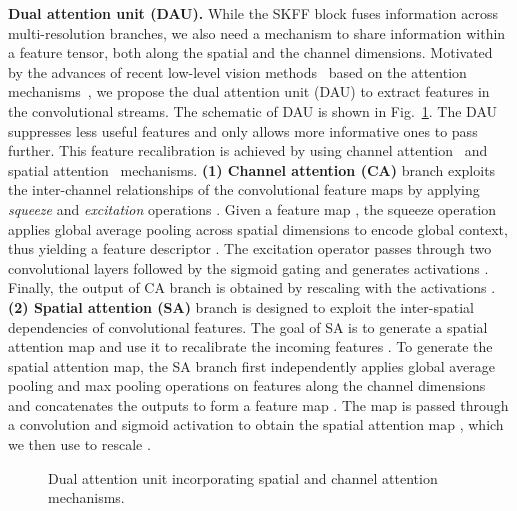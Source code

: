\documentclass[runningheads]{llncs}
\begin{document}
\vspace{0.4em} \noindent \textbf{Dual attention unit (DAU).}
While the SKFF block fuses information across multi-resolution branches, we also need a mechanism to share information within a feature tensor, both along the spatial and the channel dimensions.
Motivated by the advances of recent low-level vision methods~\cite{RCAN,RIDNet,dai2019second,zhang2019residual} based on the attention mechanisms~\cite{hu2018squeeze,wang2018non},
we propose the dual attention unit (DAU) to extract features in the convolutional streams. The schematic of DAU is shown in Fig.~\ref{fig:dau}.
The DAU suppresses less useful features and only allows more informative ones to pass further. 
This feature recalibration is achieved by using channel attention~\cite{hu2018squeeze} and spatial attention~\cite{woo2018cbam} mechanisms. 
\textbf{(1) Channel attention (CA)} branch exploits the inter-channel relationships of the convolutional feature maps by applying \emph{squeeze} and \emph{excitation} operations \cite{hu2018squeeze}. Given a feature map , the squeeze operation applies global average pooling across spatial dimensions to encode global context, thus yielding a feature descriptor . 
The excitation operator passes  through two convolutional layers followed by the sigmoid gating and generates activations . 
Finally, the output of CA branch is obtained by rescaling  with the activations .
\textbf{(2) Spatial attention (SA)} branch is designed to exploit the inter-spatial dependencies of convolutional features. The goal of SA is to generate a spatial attention map and use it to recalibrate the incoming features . 
To generate the spatial attention map, the SA branch first independently applies global average pooling and max pooling operations on features  along the channel dimensions and concatenates the outputs to form a feature map . The map  is passed through a convolution and sigmoid activation to obtain the spatial attention map , which we then use to rescale . 



\begin{figure}[t]
\begin{center}
\end{center}
\vspace*{-6mm}
\caption{\small Dual attention unit incorporating spatial and channel attention mechanisms. }
\label{fig:dau}
\vspace{-0.6em}
\end{figure}
\end{document}
